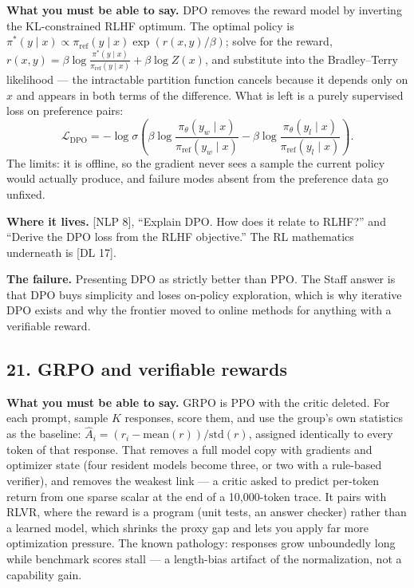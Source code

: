 \textbf{What you must be able to say.} DPO removes the reward model by inverting the KL-constrained RLHF optimum. The optimal policy is $\pi^{*}(y \mid x) \propto \pi_{\text{ref}}(y \mid x)\exp(r(x,y)/\beta)$; solve for the reward, $r(x,y) = \beta \log \frac{\pi^{*}(y\mid x)}{\pi_{\text{ref}}(y \mid x)} + \beta \log Z(x)$, and substitute into the Bradley--Terry likelihood --- the intractable partition function cancels because it depends only on $x$ and appears in both terms of the difference. What is left is a purely supervised loss on preference pairs:
\[
\mathcal{L}_{\mathrm{DPO}} = -\log \sigma\!\left(\beta \log \frac{\pi_\theta(y_w \mid x)}{\pi_{\text{ref}}(y_w \mid x)} - \beta \log \frac{\pi_\theta(y_l \mid x)}{\pi_{\text{ref}}(y_l \mid x)}\right).
\]
The limits: it is offline, so the gradient never sees a sample the current policy would actually produce, and failure modes absent from the preference data go unfixed.

\textbf{Where it lives.} [NLP 8], ``Explain DPO. How does it relate to RLHF?'' and ``Derive the DPO loss from the RLHF objective.'' The RL mathematics underneath is [DL 17].

\textbf{The failure.} Presenting DPO as strictly better than PPO. The Staff answer is that DPO buys simplicity and loses on-policy exploration, which is why iterative DPO exists and why the frontier moved to online methods for anything with a verifiable reward.

\subsection*{21. GRPO and verifiable rewards}

\textbf{What you must be able to say.} GRPO is PPO with the critic deleted. For each prompt, sample $K$ responses, score them, and use the group's own statistics as the baseline: $\hat{A}_i = (r_i - \mathrm{mean}(r))/\mathrm{std}(r)$, assigned identically to every token of that response. That removes a full model copy with gradients and optimizer state (four resident models become three, or two with a rule-based verifier), and removes the weakest link --- a critic asked to predict per-token return from one sparse scalar at the end of a 10{,}000-token trace. It pairs with RLVR, where the reward is a program (unit tests, an answer checker) rather than a learned model, which shrinks the proxy gap and lets you apply far more optimization pressure. The known pathology: responses grow unboundedly long while benchmark scores stall --- a length-bias artifact of the normalization, not a capability gain.

